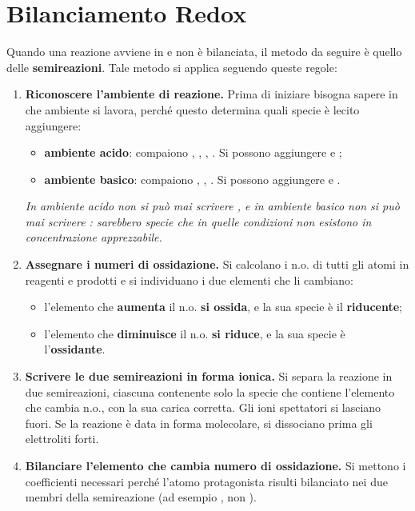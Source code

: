\documentclass[11pt, a4paper, openright]{book}
\begin{document}
\section{Bilanciamento Redox}
Quando una reazione avviene in  e non è bilanciata, il metodo da seguire è quello delle \textbf{semireazioni}. Tale metodo si applica seguendo queste regole:

\begin{enumerate}
    \item \textbf{Riconoscere l'ambiente di reazione.} Prima di iniziare bisogna sapere in che ambiente si lavora, perché questo determina quali specie è lecito aggiungere:
    \begin{itemize}
        \item \textbf{ambiente acido}: compaiono , , , . Si possono aggiungere  e ;
        \item \textbf{ambiente basico}: compaiono , , . Si possono aggiungere  e .
    \end{itemize}
    \textit{In ambiente acido non si può mai scrivere , e in ambiente basico non si può mai scrivere : sarebbero specie che in quelle condizioni non esistono in concentrazione apprezzabile.}

    \item \textbf{Assegnare i numeri di ossidazione.} Si calcolano i n.o. di tutti gli atomi in reagenti e prodotti e si individuano i due elementi che li cambiano:
    \begin{itemize}
        \item l'elemento che \textbf{aumenta} il n.o. \textbf{si ossida}, e la sua specie è il \textbf{riducente};
        \item l'elemento che \textbf{diminuisce} il n.o. \textbf{si riduce}, e la sua specie è l'\textbf{ossidante}.
    \end{itemize}

    \item \textbf{Scrivere le due semireazioni in forma ionica.} Si separa la reazione in due semireazioni, ciascuna contenente solo la specie che contiene l'elemento che cambia n.o., con la sua carica corretta. Gli ioni spettatori si lasciano fuori. Se la reazione è data in forma molecolare, si dissociano prima gli elettroliti forti.

    \item \textbf{Bilanciare l'elemento che cambia numero di ossidazione.} Si mettono i coefficienti necessari perché l'atomo protagonista risulti bilanciato nei due membri della semireazione (ad esempio , non ).


\end{enumerate}
\end{document}
